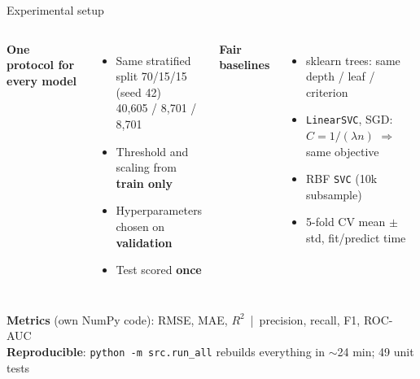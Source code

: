 \documentclass[aspectratio=169,11pt]{beamer}
\begin{document}
\begin{frame}{Experimental setup}
  \begin{columns}[T]
    \textbf{One protocol for every model}
    \begin{itemize}
      \item Same stratified split 70/15/15 (seed 42)\\
            40,605 / 8,701 / 8,701
      \item Threshold and scaling from \textbf{train only}
      \item Hyperparameters chosen on \textbf{validation}
      \item Test scored \textbf{once}
    \end{itemize}
    \textbf{Fair baselines}
    \begin{itemize}
      \item sklearn trees: same depth / leaf / criterion
      \item \texttt{LinearSVC}, SGD: $C=1/(\lambda n)$ $\Rightarrow$ same objective
      \item RBF \texttt{SVC} (10k subsample)
      \item 5-fold CV mean $\pm$ std, fit/predict time
    \end{itemize}
  \end{columns}
  \vspace{1em}
  \textbf{Metrics} (own NumPy code): RMSE, MAE, $R^2$ \,|\, precision, recall, F1, ROC-AUC\\
  \textbf{Reproducible}: \texttt{python -m src.run\_all} rebuilds everything in $\sim$24 min; 49 unit tests
\end{frame}
\end{document}
